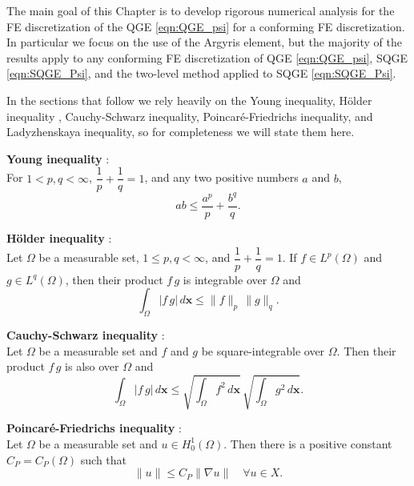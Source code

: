 The main goal of this Chapter is to develop rigorous numerical analysis for
the FE discretization of the QGE \eqref{eqn:QGE_psi} for a conforming FE
discretization. In particular we focus on the use of the Argyris element, but
the majority of the results apply to any conforming FE discretization of QGE
\eqref{eqn:QGE_psi}, SQGE \eqref{eqn:SQGE_Psi}, and the two-level method applied
to SQGE \eqref{eqn:SQGE_Psi}.

In the sections that follow we rely heavily on the Young inequality, H\"older
inequality , Cauchy-Schwarz inequality, Poincar\'e-Friedrichs inequality, and
Ladyzhenskaya inequality, so for completeness we will state them here.

\begin{definition} \label{def:Young}
  \textbf{Young inequality} \cite{Royden2010}:\\
  For $1 < p,q < \infty$, $\dfrac{1}{p} + \dfrac{1}{q} = 1$, and any two
  positive numbers $a$ and $b$,
  \begin{equation}
    ab \le \frac{a^p}{p} + \frac{b^q}{q}.
    \label{eqn:Young}
  \end{equation}
\end{definition}
\begin{definition} \label{def:Holder}
  \textbf{H\"older inequality} \cite{Royden2010}:\\
  Let $\Omega$ be a measurable set, $1\le p,q < \infty$, and $\dfrac{1}{p} +
  \dfrac{1}{q} = 1$. If $f \in L^p(\Omega)$ and $g \in L^q(\Omega)$, then their
  product $f\, g$ is integrable over $\Omega$ and
  \begin{equation}
    \int_{\Omega}\! |f\, g| \, d\mathbf{x} \le \|f\|_p\, \|g\|_q.
    \label{eqn:Holder}
  \end{equation}
\end{definition}
\begin{definition} \label{def:Cauchy-Schwarz}
  \textbf{Cauchy-Schwarz inequality} \cite{Royden2010}:\\
  Let $\Omega$ be a measurable set and $f$ and $g$ be square-integrable over
  $\Omega$. Then their product $f\, g$ is also over $\Omega$ and
  \begin{equation}
    \int_{\Omega}\! |f\,g|\, d\mathbf{x} \le \sqrt{\int_{\Omega}\! f^2 \,
      d\mathbf{x}}\, \sqrt{\int_{\Omega}\! g^2 \, d\mathbf{x}}.
    \label{eqn:Cauchy}
  \end{equation}

\end{definition}
\begin{definition} \label{def:Poincare}
  \textbf{Poincar\'e-Friedrichs inequality} \cite{Layton08}:\\
  Let $\Omega$ be a measurable set and $u \in H^1_0(\Omega)$. Then there is a
  positive constant $C_P = C_P(\Omega)$ such that
  \begin{equation}
    \|u\| \le C_P \|\nabla u\| \quad \forall u \in X.
    \label{eqn:Poincare}
  \end{equation}
\end{definition}
